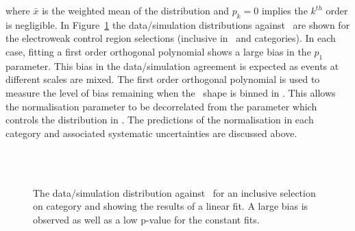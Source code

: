 where $\bar{x}$ is the weighted mean of the distribution and $p_k = 0$ 
implies the $k^{th}$ order is negligible.
In Figure~\ref{fig:linearMotiv} the data/simulation
distributions against \mht~are shown for the electroweak control region selections 
(inclusive in \scalht~and categories). In each case, 
fitting a first order orthogonal polynomial shows a large bias in the $p_1$ parameter. 
This bias in the data/simulation agreement is expected as events 
at different scales are mixed. The first order orthogonal polynomial
is used to measure the level of bias remaining 
when the \mht~shape is binned in \scalht.
This allows the normalisation parameter to be
decorrelated from the parameter which controls the distribution in \mht.
The predictions of the normalisation in each category and 
associated systematic uncertainties are discussed above.
\begin{figure}[h!]
  \centering
  ~~
  \\
  \\
  \caption{\label{fig:linearMotiv} 
  The data/simulation distribution against \mht~for an inclusive selection on category and \scalht
  showing the results of a linear fit. A large bias is observed as well as a low p-value for the constant fits. 
 }
\end{figure}

